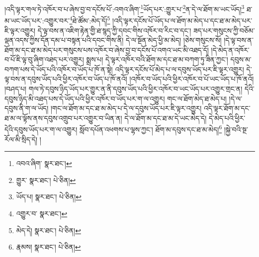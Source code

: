 །འདི་ལྟར་གལ་ཏེ་འཁོར་བ་པ་ཞེས་བྱ་བ་དངོས་པོ་:འགའ་ཞིག་\footnote{འབའ་ཞིག་  སྣར་ཐང་། }ཡོད་པར་:གྱུར་པ་\footnote{གྱུར་  སྣར་ཐང་།  པེ་ཅིན། }ན་དེ་ལ་ཐོག་མ་ཡང་ཡོད།\footnote{ཡོད་པ།  སྣར་ཐང་།  པེ་ཅིན། } ཐ་མ་ཡང་ཡོད་པར་:འགྱུར་བར་\footnote{འགྱུར་བ་  སྣར་ཐང་། }ཐེ་ཚོམ་:མེད་དོ།\footnote{མེད་དེ།  སྣར་ཐང་།  པེ་ཅིན། } །འདི་ལྟར་དངོས་པོ་ཡོད་པ་ལ་ཐོག་མ་མེད་པ་དང་ཐ་མ་མེད་པར་ཇི་ལྟར་འགྱུར། དེ་ལྟ་བས་ན་འཇིག་རྟེན་གྱི་ཐ་སྙད་ཀྱི་དབང་གིས་འཁོར་བ་རིང་བ་དང་། ཟད་པར་གསུངས་ཀྱི་བཅོམ་ལྡན་འདས་ཀྱིས་དོན་དམ་པ་བསྟན་པའི་དབང་གིས་ནི། དེ་ལ་སྔོན་མེད་ཕྱི་མ་མེད། །ཅེས་གསུངས་སོ། །དེ་ལྟ་བས་ན་ཐོག་མ་དང་ཐ་མ་མེད་པར་གསུངས་པས་འཁོར་བ་ཞེས་བྱ་བ་དངོས་པོ་འགའ་ཡང་མི་འཐད་དོ། །དེ་མེད་ན་འཁོར་བ་པོ་ཇི་ལྟ་བུ་ཞིག་འཐད་པར་འགྱུར། སྨྲས་པ། དེ་ལྟར་འཁོར་བའི་ཐོག་མ་དང་ཐ་མ་བཀག་ཏུ་ཟིན་ཀྱང་། དབུས་མ་བཀག་པས་དེ་ཡོད་པའི་འཁོར་བ་ཡོད་པ་ཁོ་ན་སྟེ། འདི་ལྟར་དངོས་པོ་མེད་པ་ལ་དབུས་ཡོད་པར་ཇི་ལྟར་འགྱུར། དེ་ལྟ་བས་ན་དབུས་ཡོད་པའི་ཕྱིར་འཁོར་བ་ཡོད་པ་ཁོ་ནའོ། །འཁོར་བ་ཡོད་པའི་ཕྱིར་འཁོར་བ་པོ་ཡང་ཡོད་པ་ཁོ་ནའོ། །བཤད་པ། གལ་ཏེ་དབུས་ཉིད་ཡོད་པར་གྱུར་ན་ནི་དབུས་ཡོད་པའི་ཕྱིར་འཁོར་བ་ཡང་ཡོད་པར་འགྱུར་གྲང་ན། དེའི་དབུས་ཉིད་མི་འཐད་པས་དེ་ཡོད་པའི་ཕྱིར་འཁོར་བ་ཡོད་པར་ག་ལ་འགྱུར། གང་ལ་ཐོག་མེད་ཐ་མེད་པ། །དེ་ལ་དབུས་ནི་ག་ལ་ཡོད། །གང་ལ་ཐོག་མ་དང་ཐ་མ་མེད་པ་དེ་ལ་དབུས་ཡོད་པར་ཇི་ལྟར་འགྱུར། འདི་ལྟར་ཐོག་མ་དང་ཐ་མ་ལ་ལྟོས་ནས་དབུས་འགྲུབ་པར་འགྱུར་བ་ཡིན་ན། དེ་ལ་ཐོག་མ་དང་ཐ་མ་དེ་ཡང་མེད་དེ། དེ་མེད་པའི་ཕྱིར་དེའི་དབུས་ཡོད་པར་ག་ལ་འགྱུར། སློབ་དཔོན་འཕགས་པ་ལྷས་ཀྱང་། ཐོག་མ་དབུས་དང་ཐ་མ་མེད།\footnote{རྣམས།  སྣར་ཐང་།  པེ་ཅིན། } །སྐྱེ་བའི་སྔ་རོལ་མི་སྲིད་དེ། །
